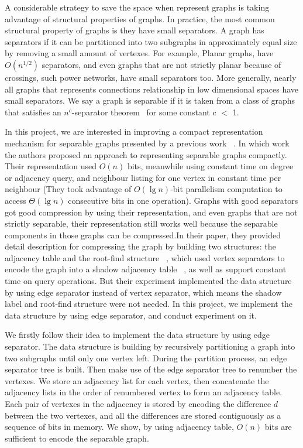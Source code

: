 \documentclass[12pt,glossary]{dalthesis}
\begin{document}
\bigskip

A considerable strategy to save the space when represent graphs is taking advantage of structural properties of graphs. In practice, the most common structural property of graphs is they have small separators. A graph has separators if it can be partitioned into two subgraphs in approximately equal size by removing a small amount of vertexes. For example, Planar graphs, have $O(n^{1/2})$ separators, and even graphs that are not strictly planar because of crossings, such power networks, have small separators too. More generally, nearly all graphs that represents connections relationship in low dimensional spaces have small separators. We say a graph is separable if it is taken from a class of graphs that satisfies an $n^{c}$-separator theorem~\cite{separator-theorem} for some constant c $<$ 1.

\bigskip

In this project, we are interested in improving a compact representation mechanism for separable graphs presented by a previous work ~\cite{compact-representation}. In which work the authors proposed an approach to representing separable graphs compactly. Their representation used $O(n)$ bits, meanwhile using constant time on degree or adjacency query, and neighbour listing for one vertex in constant time per neighbour (They took advantage of $O(\lg n)$-bit parallelism computation to access $\Theta(\lg n)$ consecutive bits in one operation). Graphs with good separators got good compression by using their representation, and even graphs that are not strictly separable, their representation still works well because the separable components in those graphs can be compressed.In their paper, they provided detail description for compressing the graph by building two structures: the adjacency table and the root-find structure ~\cite{compact-representation}, which used vertex separators to encode the graph into a shadow adjacency table ~\cite{compact-representation}, as well as support constant time on query operations. But their experiment implemented the data structure by using edge separator instead of vertex separator, which means the shadow label and root-find structure were not needed. In this project, we implement the data structure by using edge separator, and conduct experiment on it.

\bigskip
\bigskip

We firstly follow their idea to implement the data structure by using edge separator. The data structure is building by recursively partitioning a graph into two subgraphs until only one vertex left. During the partition process, an edge separator tree is built. Then make use of the edge separator tree to renumber the vertexes. We store an adjacency list for each vertex, then concatenate the adjacency lists in the order of renumbered vertex to form an adjacency table. Each pair of vertexes in the adjacency is stored by encoding the difference $d$ between the two vertexes, and all the differences are stored contiguously as a sequence of bits in memory. We show, by using adjacency table, $O(n)$ bits are sufficient to encode the separable graph. 
\end{document}

